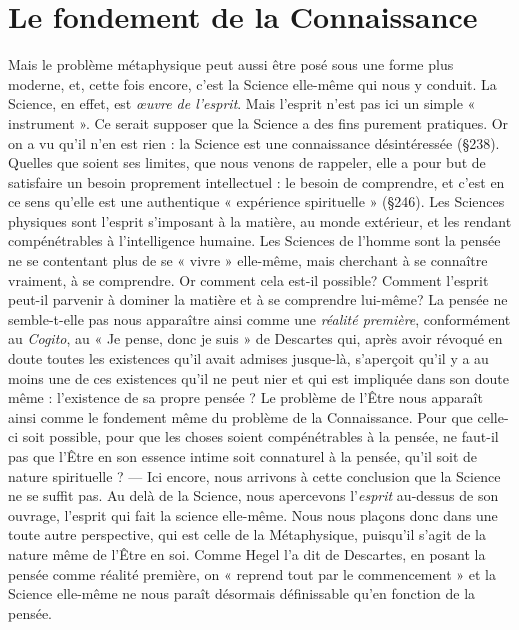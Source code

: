 \section{Le fondement de la Connaissance}%
Mais le problème
métaphysique peut aussi être posé sous une forme plus moderne, et,
cette fois encore, c’est la Science elle-même qui nous y conduit. La
Science, en effet, est {\it œuvre de l'esprit}. Mais l'esprit n’est pas ici un
simple « instrument ». Ce serait supposer que la Science a des fins
purement pratiques. Or on a vu qu’il n’en est rien : la Science est une
connaissance désintéressée (\S 238). Quelles que soient ses limites, que
nous venons de rappeler, elle a pour but de satisfaire un besoin proprement
intellectuel : le besoin de comprendre, et c’est en ce sens
qu’elle est une authentique « expérience spirituelle » (\S246). Les
Sciences physiques sont l’esprit s'imposant à la matière, au monde
extérieur, et les rendant compénétrables à l’intelligence humaine. Les
Sciences de l’homme sont la pensée ne se contentant plus de se « vivre »
elle-même, mais cherchant à se connaître vraiment, à se comprendre.
Or comment cela est-il possible? Comment l’esprit peut-il parvenir
à dominer la matière et à se comprendre lui-même? La pensée ne
semble-t-elle pas nous apparaître ainsi comme une {\it réalité première},
conformément au {\it Cogito}, au « Je pense, donc je suis » de Descartes qui,
après avoir révoqué en doute toutes les existences qu’il avait admises
jusque-là, s'aperçoit qu’il y a au moins une de ces existences qu’il ne
peut nier et qui est impliquée dans son doute même : l’existence de
sa propre pensée ? Le problème de l’Être nous apparaît ainsi comme
le fondement même du problème de la Connaissance. Pour que celle-ci
soit possible, pour que les choses soient compénétrables à la pensée,
ne faut-il pas que l'Être en son essence intime soit connaturel à la
pensée, qu’il soit de nature spirituelle ? — Ici encore, nous arrivons
à cette conclusion que la Science ne se suffit pas. Au delà de la Science,
nous apercevons l'{\it esprit} au-dessus de son ouvrage, l’esprit qui fait la
science elle-même. Nous nous plaçons donc dans une toute autre
perspective, qui est celle de la Métaphysique, puisqu'il s’agit de la
nature même de l’Être en soi. Comme Hegel l’a dit de Descartes, en
posant la pensée comme réalité première, on « reprend tout par le
commencement » et la Science elle-même ne nous paraît désormais
définissable qu’en fonction de la pensée.

